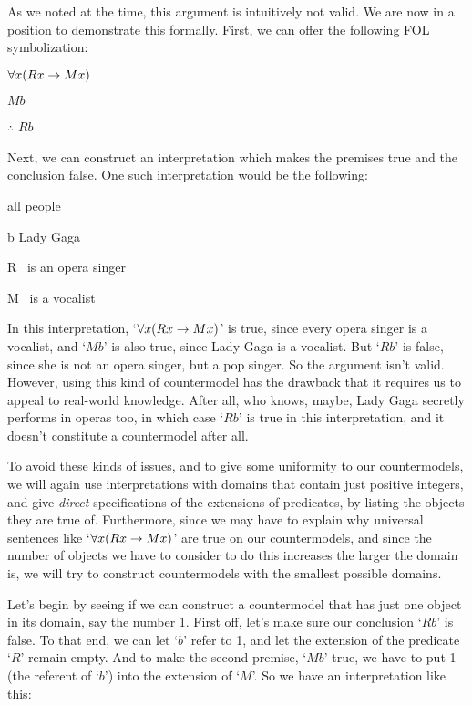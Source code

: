 \noindent As we noted at the time, this argument is intuitively not valid.  We are now in a position to demonstrate this formally.  First, we can offer the following FOL symbolization:
\begin{earg}
\item[] $\forall x(Rx \rightarrow Mx)$
\item[] $Mb$
\item[] $\therefore$ $Rb$
\end{earg}
\noindent Next, we can construct an interpretation which makes the premises true and the conclusion false.  One such interpretation would be the following:
\begin{ekey}
	\item[\text{Domain}] all people
	\item[b] Lady Gaga
	\item[R] \blank \ is an opera singer
	\item[M] \blank\ is a vocalist
\end{ekey}
In this interpretation, `$\forall x(Rx \rightarrow Mx)$' is  true, since every opera singer is a vocalist, and `$Mb$' is also true, since Lady Gaga is a vocalist.  But `$Rb$' is false, since she is not an opera singer, but a pop singer.  So the argument isn't valid.  However, using this kind of countermodel  has the drawback that it requires us to appeal to real-world knowledge.   After all, who knows, maybe, Lady Gaga secretly performs in operas too, in which case `$Rb$' is true in this interpretation, and it doesn't constitute a countermodel after all.

To avoid these kinds of issues, and to give some uniformity to our countermodels, we will again use interpretations with domains that contain just positive integers, and give \emph{direct} specifications of the extensions of predicates, by listing the objects they are true of.  Furthermore, since we may have to explain why universal sentences like `$\forall x(Rx \rightarrow Mx)$' are true on our countermodels, and since the number of objects we have to consider to do this increases the larger the domain is, we will  try to construct countermodels  with the smallest possible domains.

Let's begin by seeing if we can construct a countermodel that has just one object in its domain, say the number 1.  First off, let's make sure our conclusion `$Rb$' is false.  To that end, we can let `$b$' refer to 1, and let the extension of the predicate `$R$' remain empty.  And to make the second premise, `$Mb$' true, we have to put 1 (the referent of `$b$') into the extension of `$M$'.  So we have an interpretation like this:

